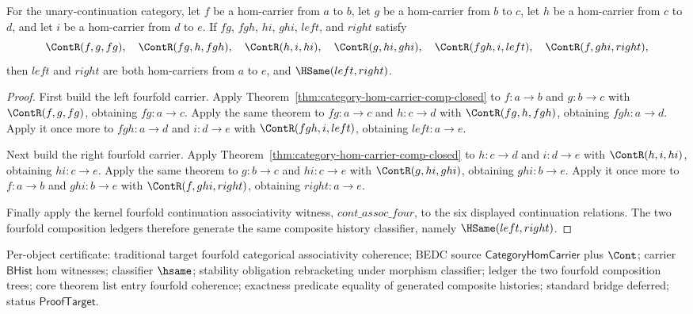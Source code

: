 \begin{theorem}
\label{thm:category-hom-carrier-fourfold-assoc-witness}
For the unary-continuation category, let $f$ be a hom-carrier from $a$ to $b$, let $g$ be a hom-carrier from $b$ to $c$, let $h$ be a hom-carrier from $c$ to $d$, and let $i$ be a hom-carrier from $d$ to $e$. If $fg$, $fgh$, $hi$, $ghi$, $left$, and $right$ satisfy
$$
\ContR(f,g,fg),\quad \ContR(fg,h,fgh),\quad \ContR(h,i,hi),\quad \ContR(g,hi,ghi),\quad \ContR(fgh,i,left),\quad \ContR(f,ghi,right),
$$
then $left$ and $right$ are both hom-carriers from $a$ to $e$, and $\HSame(left,right)$.
\end{theorem}
\begin{proof}
First build the left fourfold carrier. Apply Theorem~\ref{thm:category-hom-carrier-comp-closed} to $f:a\to b$ and $g:b\to c$ with $\ContR(f,g,fg)$, obtaining $fg:a\to c$. Apply the same theorem to $fg:a\to c$ and $h:c\to d$ with $\ContR(fg,h,fgh)$, obtaining $fgh:a\to d$. Apply it once more to $fgh:a\to d$ and $i:d\to e$ with $\ContR(fgh,i,left)$, obtaining $left:a\to e$.

Next build the right fourfold carrier. Apply Theorem~\ref{thm:category-hom-carrier-comp-closed} to $h:c\to d$ and $i:d\to e$ with $\ContR(h,i,hi)$, obtaining $hi:c\to e$. Apply the same theorem to $g:b\to c$ and $hi:c\to e$ with $\ContR(g,hi,ghi)$, obtaining $ghi:b\to e$. Apply it once more to $f:a\to b$ and $ghi:b\to e$ with $\ContR(f,ghi,right)$, obtaining $right:a\to e$.

Finally apply the kernel fourfold continuation associativity witness, $cont\_assoc\_four$, to the six displayed continuation relations. The two fourfold composition ledgers therefore generate the same composite history classifier, namely $\HSame(left,right)$.
\end{proof}

Per-object certificate: traditional target fourfold categorical associativity coherence; BEDC source $\mathsf{CategoryHomCarrier}$ plus $\Cont$; carrier $\mathsf{BHist}$ hom witnesses; classifier $\hsame$; stability obligation rebracketing under morphism classifier; ledger the two fourfold composition trees; core theorem list entry fourfold coherence; exactness predicate equality of generated composite histories; standard bridge deferred; status $\mathsf{ProofTarget}$.


